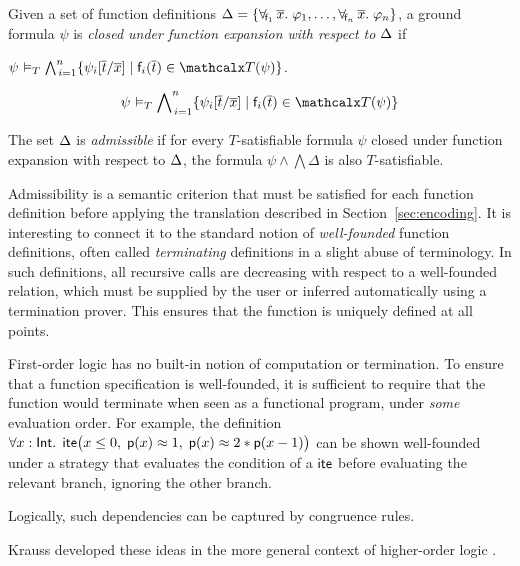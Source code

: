 \newcommand\closurefmla{\psi \models_T \bigwedge\nolimits_{\,i=1}^{n} \{ \psi_i[ \vec t / \vec x ] \mid \con{f}_i( \vec t ) \in \terms( \psi ) \}}

\begin{definition}\rm
Given a set of function definitions 
$\DDD = \{ \forallf{\con{f}_1} \vec x.\; \varphi_1, \ldots, \forallf{\con{f}_n} \vec x.\; \varphi_n \}$, 
a ground formula $\psi$ 
is \emph{closed under function expansion with respect to $\DDD$} if
\begin{shortv}$\closurefmla$. \end{shortv}%
\begin{longv}\[\closurefmla\]\end{longv}%
The set $\DDD$ is \emph{admissible} if for every $T$-satisfiable formula 
$\psi$ closed under function expansion with respect to $\DDD$,
the formula
$\psi \wedge \bigwedge \Delta$ is also $T$-satisfiable.
\end{definition}

Admissibility is a semantic criterion that must be satisfied for each function
definition before applying the translation described in
Section~\ref{sec:encoding}. It is interesting to connect it to the
standard notion of \emph{well-founded} function definitions, often called
\emph{terminating} definitions in a slight abuse of terminology. In such
definitions, all recursive calls are decreasing with respect to a well-founded
relation, which must be supplied by the user or inferred automatically
using a termination prover. This ensures that the function is uniquely defined
at all points.

First-order logic has no built-in notion of computation or termination. To ensure
that a function specification is well-founded, it is sufficient to require that
the function would terminate when seen as a functional program, under \emph{some}
evaluation order. For example, the definition
$\forall x : {\mathsf{Int}}.\;\, \mathsf{ite}\bigl(
x \leq 0,\allowbreak\; \mathsf{p}( x ) \approx 1,\allowbreak\; \mathsf{p}( x ) \approx 2 * \mathsf{p}( x - 1 ) \bigr)$
can be shown well-founded under a strategy that
evaluates the condition of a $\mathsf{ite}$ before evaluating the relevant branch,
ignoring the other branch. \begin{longv}Logically, such dependencies can be captured by
congruence rules. \end{longv}Krauss developed these ideas in the more general context of
higher-order logic \cite[Section 2]{krauss-2009-phd}.


